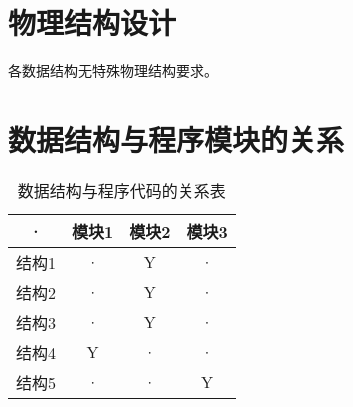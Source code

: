     \section{物理结构设计}
        各数据结构无特殊物理结构要求。
    \section{数据结构与程序模块的关系}
        \begin{table}[htbp]
            \centering
            \caption{数据结构与程序代码的关系表} \label{tab:datastructure-module}
            \begin{tabular}{|c|c|c|c|}
                \hline
                · & 模块1 & 模块2 & 模块3 \\
                \hline
                结构1 & · & Y & · \\
                \hline
                结构2 & · & Y & · \\
                \hline
                结构3 & · & Y & · \\
                \hline
                结构4 & Y & · & · \\
                \hline
                结构5 & · & · & Y \\
                \hline
            \end{tabular}
        \end{table}
